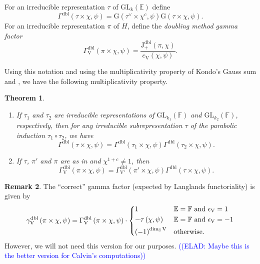 \documentclass[12pt, reqno]{amsart}
\newtheorem{theorem}{Theorem}[section]
\theoremstyle{definition}
\theoremstyle{definition}
\newtheorem{remark}[theorem]{Remark}
\theoremstyle{definition}
\newcommand{\hermitianSpace}{\mathrm{V}}
\newcommand{\fieldCharacter}{\psi}
\newcommand{\Contragradient}[1]{#1^{\vee}}
\newcommand{\involution}[1]{#1^{c}}
\newcommand{\involutionPlusOne}[1]{#1^{1+c}}
\newcommand{\GL}{\mathrm{GL}}
\newcommand{\finiteField}{\mathbb{F}}
\newcommand{\quadraticExtension}{\mathbb{E}}
\newcommand{\GaussSumSingleCharacter}[2]{\tau\left(#1, #2\right)}
\newcommand{\GaussSumScalar}[2]{\mathrm{G}\left(#1, #2\right)}
\newcommand{\posDblJacobiSumScalar}[2]{\mathrm{J}_{+}^{\mathrm{dbl}}\left(#1, #2\right)}
\newcommand{\dblGammaFactor}[3]{\Gamma^{\mathrm{dbl}}\left(#1 \times #2, #3\right)}
\newcommand{\dblGammaFactorSpace}[4]{\Gamma^{\mathrm{dbl}}_{#1}\left(#2 \times #3, #4\right)}
\newcommand{\dblLanglandsGammaFactorSpace}[4]{\gamma^{\mathrm{dbl}}_{#1}\left(#2 \times #3, #4\right)}
\newcommand{\elad}[1]{\textcolor{blue}{\sffamily ((ELAD: #1))}}
\begin{document}
For an irreducible representation $\tau$ of $\GL_k\left(\quadraticExtension\right)$ define $$\dblGammaFactor{\tau}{\chi}{\fieldCharacter} = \GaussSumScalar{\Contragradient{\tau} \times \involution{\chi}}{\fieldCharacter} \GaussSumScalar{\tau \times \chi}{\fieldCharacter}.$$
For an irreducible representation $\pi$ of $H$, define the \emph{doubling method gamma factor} $$\dblGammaFactorSpace{\hermitianSpace}{\pi}{\chi}{\fieldCharacter} = \frac{\posDblJacobiSumScalar{\pi}{\chi}}{c_{\hermitianSpace}\left(\chi, \fieldCharacter\right)}.$$

Using this notation and using the multiplicativity property of Kondo's Gauss sum and , we have the following multiplicativity property.

\begin{theorem}\label{thm:multiplicativity-in-terms-of-gamma-factors}
	\begin{enumerate}
		\item If $\tau_1$ and $\tau_2$ are irreducible representations of $\GL_{k_1}\left(\finiteField\right)$ and $\GL_{k_2}\left(\finiteField\right)$, respectively, then for any irreducible subrepresentation $\tau$ of the parabolic induction $\tau_1 \circ \tau_2$, we have
		$$\dblGammaFactor{\tau}{\chi}{\fieldCharacter} = \dblGammaFactor{\tau_1}{\chi}{\fieldCharacter} \dblGammaFactor{\tau_2}{\chi}{\fieldCharacter}.$$
		\item If $\tau$, $\pi'$ and $\pi$ are as in  and $\involutionPlusOne{\chi} \ne 1$, then
		$$\dblGammaFactorSpace{\hermitianSpace}{\pi}{\chi}{\fieldCharacter} = \dblGammaFactorSpace{\hermitianSpace'}{\pi'}{\chi}{\fieldCharacter} \dblGammaFactor{\tau}{\chi}{\fieldCharacter}.$$
	\end{enumerate}
\end{theorem}

\begin{remark}
	The ``correct'' gamma factor (expected by Langlands functoriality) is given by $$\dblLanglandsGammaFactorSpace{\hermitianSpace}{\pi}{\chi}{\fieldCharacter} = \dblGammaFactorSpace{\hermitianSpace}{\pi}{\chi}{\fieldCharacter} \cdot \begin{dcases}
		1 & \quadraticExtension = \finiteField \text{ and } \epsilon_{\hermitianSpace} = 1\\
		-\GaussSumSingleCharacter{\chi} {\fieldCharacter} & \quadraticExtension = \finiteField \text{ and } \epsilon_{\hermitianSpace} = -1 \\
		\left(-1\right)^{\dim_{\quadraticExtension} \hermitianSpace} & \text{otherwise.}
	\end{dcases}$$
	However, we will not need this version for our purposes. \elad{Maybe this is the better version for Calvin's computations}
\end{remark}
\end{document}
